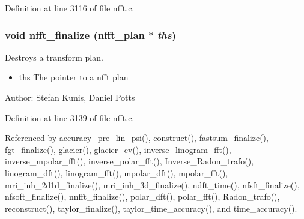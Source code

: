 Definition at line 3116 of file nfft.c.\hypertarget{group__nfft_g614f9f7af5b0d5491afa9495393c4dc3}{
\subsubsection{\setlength{\rightskip}{0pt plus 5cm}void nfft\_\-finalize ({\bf nfft\_\-plan} $\ast$ {\em ths})}}
\label{group__nfft_g614f9f7af5b0d5491afa9495393c4dc3}


Destroys a transform plan. 

\begin{itemize}
\item ths The pointer to a nfft plan\end{itemize}
\begin{Desc}
\item[Author:]Stefan Kunis, Daniel Potts \end{Desc}


Definition at line 3139 of file nfft.c.

Referenced by accuracy\_\-pre\_\-lin\_\-psi(), construct(), fastsum\_\-finalize(), fgt\_\-finalize(), glacier(), glacier\_\-cv(), inverse\_\-linogram\_\-fft(), inverse\_\-mpolar\_\-fft(), inverse\_\-polar\_\-fft(), Inverse\_\-Radon\_\-trafo(), linogram\_\-dft(), linogram\_\-fft(), mpolar\_\-dft(), mpolar\_\-fft(), mri\_\-inh\_\-2d1d\_\-finalize(), mri\_\-inh\_\-3d\_\-finalize(), ndft\_\-time(), nfsft\_\-finalize(), nfsoft\_\-finalize(), nnfft\_\-finalize(), polar\_\-dft(), polar\_\-fft(), Radon\_\-trafo(), reconstruct(), taylor\_\-finalize(), taylor\_\-time\_\-accuracy(), and time\_\-accuracy().